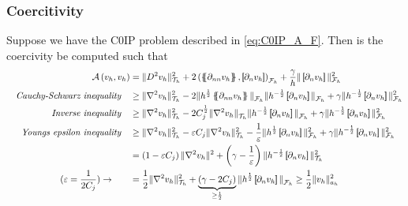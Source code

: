 \subsubsection{Coercitivity}%
\label{ssub:coercitivity}


Suppose we have the C0IP problem described in \eqref{eq:C0IP_A_F}. Then is the coercivity be computed such that
\[
    \begin{split}
\mathcal{A} \left( v_{h}, v_{h} \right) & = \| D^2v_{h} \|_{ \mathcal{T} _{h} }^{2  }  + 2 \left(  \mean{ \partial _{nn} v_{h} }    ,  \jump{ \partial _{n}v_{h} }     \right) _{\mathcal{F} _{h}} +  \frac{\gamma}{h} \|  \jump{ \partial _{n} v_{h} }
  \|_{ \mathcal{F} _{h} }^{ 2 } \\
\quad \textit{Cauchy-Schwarz inequality} \quad
& \ge \| \nabla ^2 v_{h} \|_{ \mathcal{T} _{h} }^{2  } -2 \| h^{\frac{1}{2}} \mean{ \partial _{nn}v_{h} }    \|_{  \mathcal{F} _{h}}^{  } \| h^{-\frac{1}{2}} \jump{ \partial _{n}v_{h} }    \|_{  \mathcal{F} _{h}}^{  } + \gamma \| h^{-\frac{1}{2}}  \jump{ \partial _{n}v_{h} }   \|_{ \mathcal{F} _{h}  }^{ 2 } \\
\quad \textit{Inverse inequality} \quad
 &  \ge  \| \nabla ^2 v_{h}  \|_{ \mathcal{T} _{h}  }^{ 2  } - 2 C^{\frac{1}{2}}_{j} \|   \nabla ^2 v_{h}    \|_{ \mathcal{T} _{h}  }^{  } \| h^{-\frac{1}{2}} \jump{ \partial _{n} v_{h} }   \|_{ \mathcal{F} _{h} }^{  }  + \gamma \| h^{ -\frac{1}{2}} \jump{
 \partial _{n } v_{h}}   \|_{ \mathcal{F}_{h}}^{2}  \\
\quad \textit{ Youngs epsilon inequality} \quad
  &  \ge  \| \nabla ^2 v_{h} \|_{ \mathcal{T}_{h}  }^{2  } - \varepsilon C_{j} \| \nabla ^2 v_{h} \|_{ \mathcal{T} _{h} }^{2  } - \frac{1}{\varepsilon } \| h^{\frac{1}{2}} \jump{ \partial _{n} v_{h} }   \|_{ \mathcal{F} _{h} }^{2  }  + \gamma \|
  h^{-\frac{1}{2}} \jump{ \partial _{n} v_{h}}   \|_{ \mathcal{F} _{h} }^{2  }  \\
  & =  \left( 1 - \varepsilon C_{j} \right) \| \nabla ^2 v_{h} \|_{  }^{ 2 } + \left( \gamma  - \frac{1}{\varepsilon } \right) \| h^{-\frac{1}{2}} \jump{ \partial _{n} v_{h} }   \|_{ \mathcal{T} _{h} }^{ 2 } \\
  (\varepsilon  = \frac{1}{2 C_{j} }) \to  \quad \quad &= \frac{1}{2} \| \nabla ^2 v_{h} \|_{ \mathcal{T} _{h} }^{ 2 }  + \underbrace{\left( \gamma -2 C_{j} \right)}_{ \ge  \frac{1}{2}}  \| h^{\frac{1}{2}} \jump{ \partial _{n} v_{h} }   \|_{
  \mathcal{F} _{h} }^{  } \ge \frac{1}{2} \| v_{h} \|_{ a_{h} }^{  2}    \\
    \end{split}
\]

